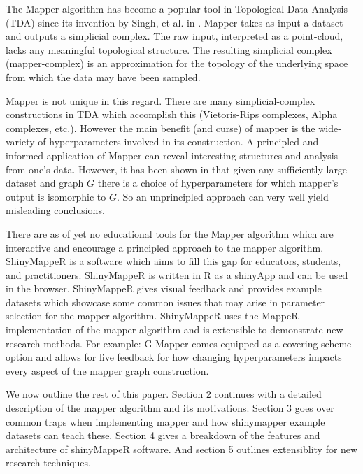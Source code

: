 The Mapper algorithm has become a popular tool in Topological Data Analysis 
(TDA) since its invention by Singh, et al. in \cite{Singh2007}. Mapper takes 
as input a dataset and outputs a simplicial complex. The raw input, 
interpreted as a point-cloud, lacks any meaningful topological structure. 
The resulting simplicial complex (mapper-complex) is an approximation 
for the topology of the underlying space from which the data may have been 
sampled.

Mapper is not unique in this regard. There are many simplicial-complex 
constructions in TDA which accomplish this (Vietoris-Rips complexes, 
Alpha complexes, etc.). However the main benefit (and curse) of mapper is 
the wide-variety of hyperparameters involved in its construction. A 
principled and informed application of Mapper can reveal interesting 
structures and analysis from one's data. However, it has been shown in 
\cite{alvarado2024graphmappergraph} that given any sufficiently large 
dataset and graph $G$ there is a choice of hyperparameters for which mapper's 
output is isomorphic to $G$. So an unprincipled approach can very well 
yield misleading conclusions.

There are as of yet no educational tools for the Mapper algorithm which 
are interactive and encourage a principled approach to the mapper algorithm.
ShinyMappeR is a software which aims to fill this gap for educators, students, 
and practitioners. ShinyMappeR is written in R as a shinyApp and can be used 
in the browser. ShinyMappeR gives visual feedback and provides example 
datasets which showcase some common issues that may arise in parameter selection 
for the mapper algorithm. ShinyMappeR uses the MappeR implementation of the 
mapper algorithm and is extensible to demonstrate new research methods. 
For example: G-Mapper comes equipped as a covering scheme option and allows for live 
feedback for how changing hyperparameters impacts every aspect of the mapper 
graph construction.

We now outline the rest of this paper. Section 2 continues with a detailed
description of the mapper algorithm and its motivations. Section 3 goes over common 
traps when implementing mapper and how shinymapper example datasets can teach 
these. Section 4 gives a breakdown of the features and architecture of shinyMappeR software. 
And section 5 outlines extensiblity for new research techniques.
